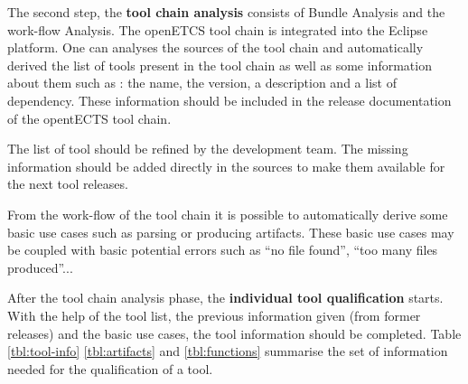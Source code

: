


The second step, the {\bf tool chain analysis} consists of Bundle Analysis
and the work-flow Analysis.
The openETCS tool chain is integrated into the Eclipse platform. One
can analyses the sources of the tool chain and automatically derived
the list of tools present in the tool chain as well as some
information about them such as :  the name,  the version,
a description and a list of dependency.
These information should be included in the release documentation of
the opentECTS tool chain.

The list of tool should be refined by the development team.
The missing information should be added directly in the
sources to make them available for the next tool releases.


From the work-flow of the tool chain it is possible to automatically
derive some basic use cases such as parsing or producing
artifacts. These basic use cases may be coupled with basic potential
errors such as ``no file found'', ``too many files produced''...

After the tool chain analysis phase, the {\bf individual tool qualification}
starts. With the help of the tool list, the previous information given
(from former releases) and the basic use cases, the tool information
should be completed. Table \ref{tbl:tool-info} \ref{tbl:artifacts} and
\ref{tbl:functions} summarise the set of information needed for the
qualification of a tool.



